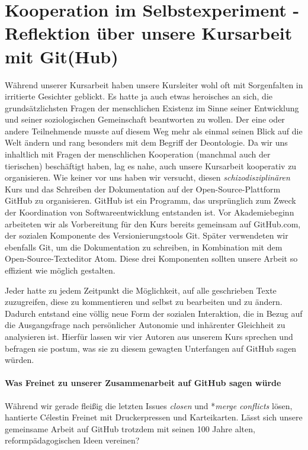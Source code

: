 \section{Kooperation im Selbstexperiment - Reflektion über unsere Kursarbeit mit Git(Hub)}

Während unserer Kursarbeit haben unsere Kursleiter wohl oft mit Sorgenfalten in irritierte Gesichter geblickt.
Es hatte ja auch etwas heroisches an sich, die grundsätzlichsten Fragen der menschlichen Existenz im Sinne seiner Entwicklung und seiner soziologischen Gemeinschaft beantworten zu wollen.
Der eine oder andere Teilnehmende musste auf diesem Weg mehr als einmal seinen Blick auf die Welt ändern und rang besonders mit dem Begriff der Deontologie.
Da wir uns inhaltlich mit Fragen der menschlichen Kooperation (manchmal auch der tierischen) beschäftigt haben, lag es nahe, auch unsere Kursarbeit kooperativ zu organisieren.
Wie keiner vor uns haben wir versucht, diesen \emph{schizodisziplinären} Kurs und das Schreiben der Dokumentation auf der Open-Source-Plattform GitHub zu organisieren.
GitHub ist ein Programm, das ursprünglich zum Zweck der Koordination von Softwareentwicklung entstanden ist.
Vor Akademiebeginn arbeiteten wir als Vorbereitung für den Kurs bereits gemeinsam auf GitHub.com, der sozialen Komponente des Versionierungstools Git.
Später verwendeten wir ebenfalls Git, um die Dokumentation zu schreiben, in Kombination mit dem Open-Source-Texteditor Atom.
Diese drei Komponenten sollten unsere Arbeit so effizient wie möglich gestalten.

Jeder hatte zu jedem Zeitpunkt die Möglichkeit, auf alle geschrieben Texte zuzugreifen, diese zu kommentieren und selbst zu bearbeiten und zu ändern.
Dadurch entstand eine völlig neue Form der sozialen Interaktion, die in Bezug auf die Ausgangsfrage nach persönlicher Autonomie und inhärenter Gleichheit zu analysieren ist.
Hierfür lassen wir vier Autoren aus unserem Kurs sprechen und befragen sie postum, was sie zu diesem gewagten Unterfangen auf GitHub sagen würden.


\paragraph*{Was Freinet zu unserer Zusammenarbeit auf GitHub sagen würde}

Während wir gerade fleißig die letzten Issues \emph{closen} und *\emph{merge conflicts} lösen, hantierte Célestin Freinet mit Druckerpressen und Karteikarten.
Lässt sich unsere gemeinsame Arbeit auf GitHub trotzdem mit seinen 100 Jahre alten, reformpädagogischen Ideen vereinen?

